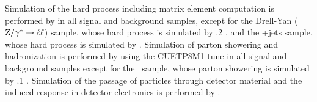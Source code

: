 Simulation of the hard process including matrix element computation is performed by  \cite{Nason:2004rx,Frixione:2007vw,Alioli:2010xd} in all signal and background samples, except for the Drell-Yan ($\mathrm{Z}/\gamma^* \to \ell\ell$) sample, whose hard process is simulated by .2 \cite{Alwall:2014hca}, and the \PW+jets sample, whose hard process is simulated by  \cite{Alwall:2011uj}.
Simulation of parton showering and hadronization is performed by  using the CUETP8M1 tune \cite{Sjostrand:2014zea,Khachatryan:2015pea} in all signal and background samples except for the \PW\PW\ sample, whose parton showering is simulated by .1 \cite{Bahr:2008pv}.
Simulation of the passage of particles through detector material and the induced response in detector electronics is performed by \GEANTfour \cite{Agostinelli:2002hh,Allison:2006ve,Allison:2016lfl}.


